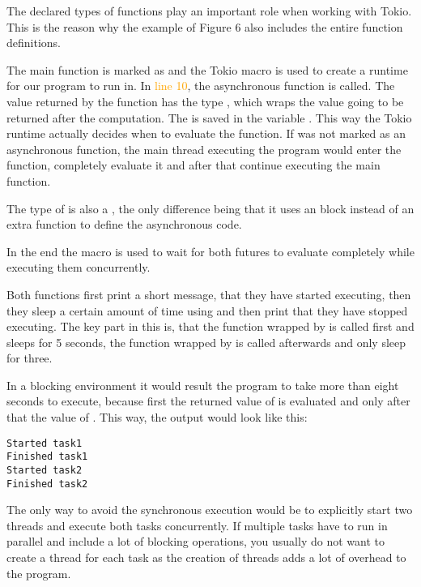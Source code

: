 The declared types of functions play an important role when working with Tokio. This is the reason why the example
of Figure 6 also includes the entire function definitions.

The main function is marked as  and the Tokio macro is used to create a runtime for our program to run in.
In \textcolor{orange}{line 10}, the asynchronous function  is called. The value returned by the
function has the type , which wraps the value going to be returned after the computation. The
 is saved in the variable . This way the Tokio runtime actually decides when to evaluate the
function. If  was not marked as an asynchronous function, the main thread executing the program
would enter the function, completely evaluate it and after that continue executing the main function.

The type of  is also a , the only difference being that it uses an  block
instead of an extra function to define the asynchronous code.

In the end the macro  is used to wait for both futures to evaluate completely while executing them
concurrently.

Both functions first print a short message, that they have started executing, then they sleep a certain amount of time
using  and then print that they have stopped executing. The key part in this is, that the
function wrapped by  is called first and sleeps for 5 seconds, the function wrapped by  is
called afterwards and only sleep for three.

In a blocking environment it would result the program to take more than eight seconds to execute, because first the
returned value of  is evaluated and only after that the value of . This way, the output
would look like this:

\begin{verbatim}
Started task1
Finished task1
Started task2
Finished task2
\end{verbatim}

The only way to avoid the synchronous execution would be to explicitly start two threads and execute both tasks
concurrently. If multiple tasks have to run in parallel and include a lot of blocking operations, you usually do not
want to create a thread for each task as the creation of threads adds a lot of overhead to the program.

